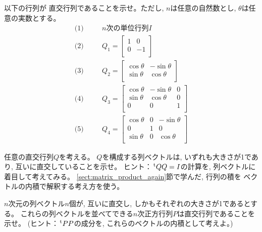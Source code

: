 \begin{q}\label{q:matrix_orthogonal_exmpl1} 以下の行列が
直交行列であることを示せ。ただし, $n$は任意の自然数とし, 
$\theta$は任意の実数とする。
\begin{eqnarray}
\text{(1)}\quad&&\text{$n$次の単位行列$I$}\nonumber\\
\text{(2)}\quad&&Q_1=\left[\begin{array}{cc}
1 & 0\\
0 & -1\\
\end{array}\right]\\
\text{(3)}\quad&&Q_2=\left[\begin{array}{cc}
\cos\theta & -\sin\theta\\
\sin\theta & \cos\theta\\
\end{array}\right]\\
\text{(4)}\quad&&Q_3=\left[\begin{array}{ccc}
\cos\theta & -\sin\theta & 0\\
\sin\theta & \cos\theta & 0\\
0          & 0         & 1\\
\end{array}\right]\\
\text{(5)}\quad&&Q_4=\left[\begin{array}{ccc}
\cos\theta & 0 & -\sin\theta\\
0         & 1 & 0         \\
\sin\theta & 0 & \cos\theta\\
\end{array}\right]
\end{eqnarray}
\mv


\begin{q}\label{q:AB_orthogmatrix} 任意の直交行列$Q$を考える。
$Q$を構成する列ベクトルは, いずれも大きさが1であり, 
互いに直交していることを示せ。
ヒント：$\,^{\text t}QQ=I$の計算を, 列ベクトルに着目して考えてみる。
\ref{sect:matrix_product_again}節で学んだ, 行列の積を
ベクトルの内積で解釈する考え方を使う。
\end{q}
\mv

\begin{q}\label{q:orthonorm_vec_ortogonal_matrix} $n$次元の列ベクトル$n$個が, 
互いに直交し, しかもそれぞれの大きさが1であるとする。
これらの列ベクトルを並べてできる$n$次正方行列$P$は直交行列であることを示せ。
(ヒント：$\,^{\text t}PP$の成分を, これらのベクトルの内積として考えよ。)
\end{q}
\mv


\end{q}
